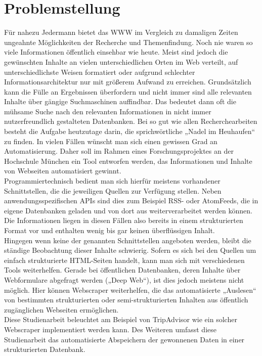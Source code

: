 \documentclass[a4paper,oneside,12pt]{report}
\begin{document}
	


	\newpage
	\tableofcontents
	
	
	
	
	
	\chapter{Problemstellung}\label{probstellung}
	
		Für nahezu Jedermann bietet das WWW im Vergleich zu damaligen Zeiten ungeahnte Möglichkeiten der Recherche und Themenfindung. Noch nie waren so viele Informationen öffentlich einsehbar wie heute. Meist sind jedoch die gewünschten Inhalte an vielen unterschiedlichen Orten im Web verteilt, auf unterschiedlichste Weisen formatiert oder aufgrund schlechter Informationsarchitektur nur mit größerem Aufwand zu erreichen. Grundsätzlich kann die Fülle an Ergebnissen überfordern und nicht immer sind alle relevanten Inhalte über gängige Suchmaschinen auffindbar. Das bedeutet dann oft die mühsame Suche nach den relevanten Informationen in nicht immer nutzerfreundlich gestalteten Datenbanken. Bei so gut wie allen Recherchearbeiten besteht die Aufgabe heutzutage darin, die sprichwörtliche „Nadel im Heuhaufen“ zu finden. In vielen Fällen wünscht man sich einen gewissen Grad an Automatisierung. Daher soll im Rahmen eines Forschungsprojektes an der Hochschule München ein Tool entworfen werden, das Informationen und Inhalte von Webseiten automatisiert gewinnt. 
		\\
		Programmiertechnisch bedient man sich hierfür meistens vorhandener Schnittstellen, die die jeweiligen Quellen zur Verfügung stellen. Neben anwendungsspezifischen APIs sind dies zum Beispiel RSS- oder AtomFeeds, die in eigene Datenbanken geladen und von dort aus weiterverarbeitet werden können. \cite{bib-atomfeed} Die Informationen liegen in diesen Fällen also bereits in einem strukturierten Format vor und enthalten wenig bis gar keinen überflüssigen Inhalt.
		\\
		Hingegen wenn keine der genannten Schnittstellen angeboten werden, bleibt die ständige Beobachtung dieser Inhalte schwierig. Sofern es sich bei den Quellen um einfach strukturierte HTML-Seiten handelt, kann man sich mit verschiedenen Tools weiterhelfen. Gerade bei öffentlichen Datenbanken, deren Inhalte über Webformulare abgefragt werden („Deep Web“), ist dies jedoch meistens nicht möglich. \cite{bib-deepweb} Hier können Webscraper weiterhelfen, die das automatisierte „Auslesen“ von bestimmten strukturierten	oder semi-strukturierten Inhalten aus öffentlich zugänglichen Webseiten ermöglichen. 
		\\
		\newline
		Diese Studienarbeit beleuchtet am Beispiel von TripAdvisor wie ein solcher Webscraper implementiert werden kann. Des Weiteren umfasst diese Studienarbeit das automatisierte Abspeichern der gewonnenen Daten in einer strukturierten Datenbank.
		
\end{document}
